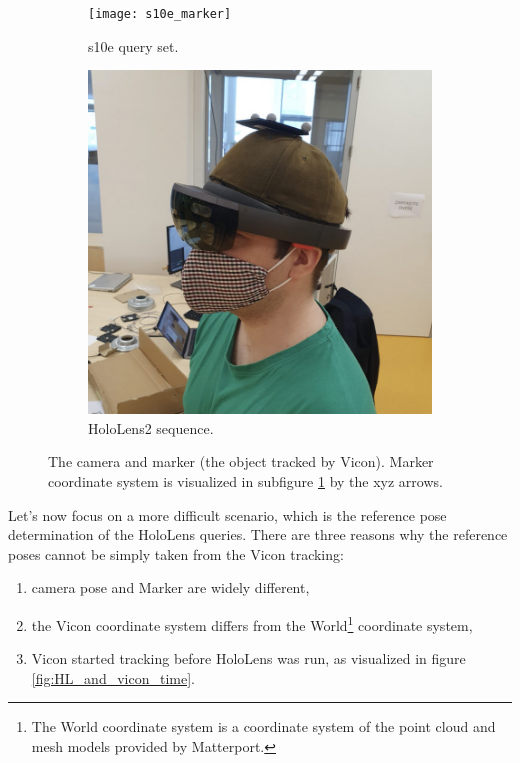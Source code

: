 \documentclass[twoside]{ctuthesis}
\theoremstyle{plain}
\theoremstyle{definition}
\theoremstyle{note}
\newcommand{\code}[1]{{\ttfamily #1%
}}
\begin{document}
\begin{figure}
	\begin{subfigure}{0.45\textwidth}
		\texttt{[image: s10e\_marker]}
		\caption{s10e query set.}
		\label{fig:s10e-marker}
	\end{subfigure}
	\hspace*{\fill}	%
	\begin{subfigure}{0.45\textwidth}
		\includegraphics[width=\textwidth]{HL1_marker}
		\caption{HoloLens2 sequence.}
		\label{fig:holoLens-marker}
	\end{subfigure}
	\caption[Camera and Marker]{The camera and marker (the object tracked by Vicon). Marker coordinate system is visualized in subfigure \ref{fig:s10e-marker} by the \code{xyz} arrows.}
	\label{fig:camera-markers}
\end{figure}

Let's now focus on a more difficult scenario, which is the reference pose determination of the HoloLens queries. There are three reasons why the reference poses cannot be simply taken from the Vicon tracking:

\begin{enumerate}
	\item camera pose and Marker are widely different,
	\item the Vicon coordinate system differs from the World\footnote{The World coordinate system is a coordinate system of the point cloud and mesh models provided by Matterport.} coordinate system,
	\item Vicon started tracking before HoloLens was run, as visualized in figure \ref{fig:HL_and_vicon_time}.
\end{enumerate}
\end{document}
